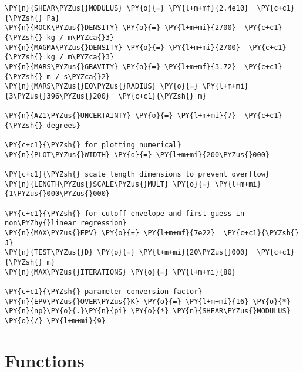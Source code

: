 \begin{tcolorbox}[breakable, size=fbox, boxrule=1pt, pad at break*=1mm,colback=cellbackground, colframe=cellborder]
\begin{Verbatim}[commandchars=\\\{\}]
\PY{n}{SHEAR\PYZus{}MODULUS} \PY{o}{=} \PY{l+m+mf}{2.4e10}  \PY{c+c1}{\PYZsh{} Pa}
\PY{n}{ROCK\PYZus{}DENSITY} \PY{o}{=} \PY{l+m+mi}{2700}  \PY{c+c1}{\PYZsh{} kg / m\PYZca{}3}
\PY{n}{MAGMA\PYZus{}DENSITY} \PY{o}{=} \PY{l+m+mi}{2700}  \PY{c+c1}{\PYZsh{} kg / m\PYZca{}3}
\PY{n}{MARS\PYZus{}GRAVITY} \PY{o}{=} \PY{l+m+mf}{3.72}  \PY{c+c1}{\PYZsh{} m / s\PYZca{}2}
\PY{n}{MARS\PYZus{}EQ\PYZus{}RADIUS} \PY{o}{=} \PY{l+m+mi}{3\PYZus{}396\PYZus{}200}  \PY{c+c1}{\PYZsh{} m}

\PY{n}{AZ1\PYZus{}UNCERTAINTY} \PY{o}{=} \PY{l+m+mi}{7}  \PY{c+c1}{\PYZsh{} degrees}

\PY{c+c1}{\PYZsh{} for plotting numerical}
\PY{n}{PLOT\PYZus{}WIDTH} \PY{o}{=} \PY{l+m+mi}{200\PYZus{}000}

\PY{c+c1}{\PYZsh{} scale length dimensions to prevent overflow}
\PY{n}{LENGTH\PYZus{}SCALE\PYZus{}MULT} \PY{o}{=} \PY{l+m+mi}{1\PYZus{}000\PYZus{}000}

\PY{c+c1}{\PYZsh{} for cutoff envelope and first guess in non\PYZhy{}linear regression}
\PY{n}{MAX\PYZus{}EPV} \PY{o}{=} \PY{l+m+mf}{7e22}  \PY{c+c1}{\PYZsh{} J}
\PY{n}{TEST\PYZus{}D} \PY{o}{=} \PY{l+m+mi}{20\PYZus{}000}  \PY{c+c1}{\PYZsh{} m}
\PY{n}{MAX\PYZus{}ITERATIONS} \PY{o}{=} \PY{l+m+mi}{80}

\PY{c+c1}{\PYZsh{} parameter conversion factor}
\PY{n}{EPV\PYZus{}OVER\PYZus{}K} \PY{o}{=} \PY{l+m+mi}{16} \PY{o}{*} \PY{n}{np}\PY{o}{.}\PY{n}{pi} \PY{o}{*} \PY{n}{SHEAR\PYZus{}MODULUS} \PY{o}{/} \PY{l+m+mi}{9}
\end{Verbatim}
\end{tcolorbox}

\hypertarget{functions}{%
\section{Functions}\label{functions}}

